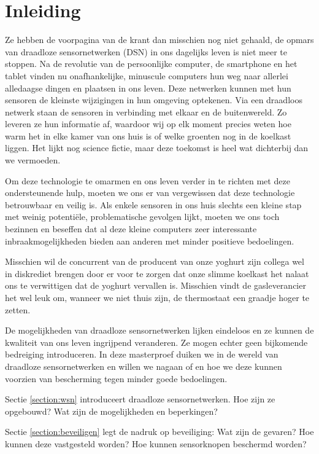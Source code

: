 
\chapter{Inleiding}
\label{inleiding}

Ze hebben de voorpagina van de krant dan misschien nog niet gehaald, de opmars
van draadloze sensornetwerken (DSN) in ons dagelijks leven is niet meer te
stoppen. Na de revolutie van de persoonlijke computer, de smartphone en het
tablet vinden nu onafhankelijke, minuscule computers hun weg naar allerlei
alledaagse dingen en plaatsen in ons leven. Deze netwerken kunnen met hun
sensoren de kleinste wijzigingen in hun omgeving optekenen. Via een draadloos
netwerk staan de sensoren in verbinding met elkaar en de buitenwereld. Zo
leveren ze hun informatie af, waardoor wij op elk moment precies weten hoe warm
het in elke kamer van ons huis is of welke groenten nog in de koelkast liggen.
Het lijkt nog science fictie, maar deze toekomst is heel wat dichterbij dan we
vermoeden.

Om deze technologie te omarmen en ons leven verder in te richten met deze
ondersteunende hulp, moeten we ons er van vergewissen dat deze technologie
betrouwbaar en veilig is. Als enkele sensoren in ons huis slechts een kleine
stap met weinig potenti\"ele, problematische gevolgen lijkt, moeten we ons toch
bezinnen en beseffen dat al deze kleine computers zeer interessante
inbraakmogelijkheden bieden aan anderen met minder positieve bedoelingen.

Misschien wil de concurrent van de producent van onze yoghurt zijn collega wel
in diskrediet brengen door er voor te zorgen dat onze slimme koelkast het
nalaat ons te verwittigen dat de yoghurt vervallen is. Misschien vindt de
gasleverancier het wel leuk om, wanneer we niet thuis zijn, de thermostaat een
graadje hoger te zetten.

De mogelijkheden van draadloze sensornetwerken lijken eindeloos en ze kunnen de
kwaliteit van ons leven ingrijpend veranderen. Ze mogen echter geen bijkomende
bedreiging introduceren. In deze masterproef duiken we in de wereld van
draadloze sensornetwerken en willen we nagaan of en hoe we deze kunnen voorzien
van bescherming tegen minder goede bedoelingen.

Sectie \ref{section:wsn} introduceert draadloze sensornetwerken. Hoe zijn ze
opgebouwd? Wat zijn de mogelijkheden en beperkingen? 

Sectie \ref{section:beveiligen} legt de nadruk op beveiliging: Wat zijn de
gevaren? Hoe kunnen deze vastgesteld worden? Hoe kunnen sensorknopen beschermd
worden?

